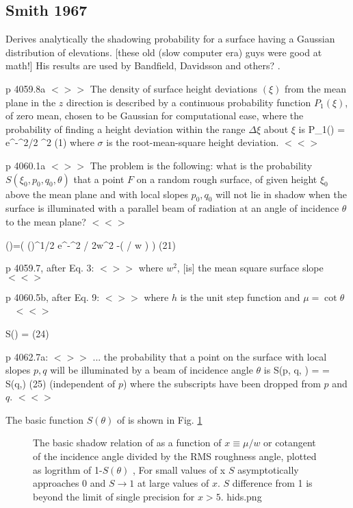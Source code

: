\documentclass{article}
\newcommand{\erfc}{\mathrm{erfc}}  %
\newcommand{\qeq}{\hspace{25.mm}} %
\newcommand{\bq}{$ < \! > \!   \! >$ } %
\newcommand{\eq}{ $< \! \! < \! > $ } %
\begin{document}
\subsection{Smith  1967} %

Derives analytically the shadowing probability for a surface having a Gaussian
distribution of elevations. [these old (slow computer era) guys were good at
  math!] His results are used by Bandfield, Davidsson and others? .

p 4059.8a \bq The density of surface height deviations $(\xi)$ from the mean
plane in the $z$ direction is described by a continuous probability function
$P_1(\xi)$, of zero mean, chosen to be Gaussian for computational ease, where
the probability of finding a height deviation within the range $\Delta \xi$
about $\xi$ is 
\qb P_1(\xi) \Delta \xi = 
e^{-\xi^2/2 \sigma ^2} \cdot \Delta \xi \qeq (1) \qe 
where $\sigma$ is the root-mean-square height deviation. \eq

p 4060.1a \bq The problem is the following: what is the probability $ S( \xi_0,
p_0, q_0, \theta)$ that a point $F$ on a random rough surface, of given height
$\xi_0$ above the mean plane and with local slopes $p_0, q_0$ will not lie in
shadow when the surface is illuminated with a parallel beam of radiation at an
angle of incidence $\theta$ to the mean plane? \eq

 \Lambda(\mu)=\left( \left(\right)^{1/2} \cdot {}
e^{-\mu^2 / 2w^2} -\erfc \left(  \mu /  w \right) \right)  \qeq (21) \qe

p 4059.7, after Eq. 3:  \bq where $w^2$, [is] the mean square surface slope
\eq

p 4060.5b, after Eq. 9: \bq where $h$ is the unit step function and $\mu = \cot
\theta $ \ \eq
 
\qb S(\theta) = \frac{ \left[ 1- \frac{1}{2} \erfc \left( \mu / \sqrt{2} w
    \right) \right]} {\left[ \Lambda(\mu) +1 \right] } \qeq (24) \qe

p 4062.7a: \bq ... the probability that a point on the surface with local slopes
$p, q$ will be illuminated by a beam of incidence angle $\theta$ is
\qb S(p, q, \theta) =  =
S(q,\theta) \qeq (25) \qe (independent of $p$) where the subscripts have been
dropped from $p$ and $q$. \eq

The basic function $S(\theta)$ of  is shown in Fig.
\ref{hids}
\begin{figure}[!ht] 
\caption[Shadow function]{The basic shadow relation of  as a
  function of $x\equiv \mu/w$ or cotangent of the incidence angle divided by the
  RMS roughness angle, plotted as logrithm of 1-$S(\theta)$ , For small values
  of x $S$ asymptotically approaches 0 and $S \rightarrow 1$ at large values of
  $x$. $S$ difference from 1 is beyond the limit of single precision for $x >
  5$.
\label{hids}  hids.png  }
\end{figure} 
\end{document}
